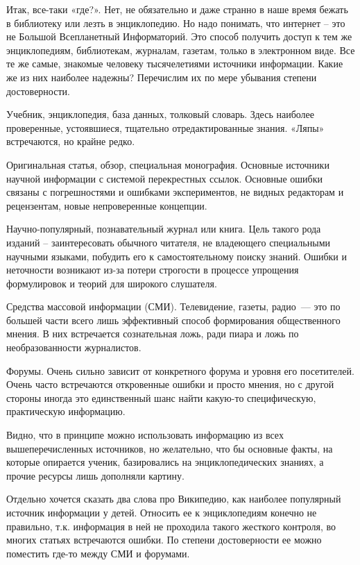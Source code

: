 Итак, все-таки «где?». Нет, не обязательно и даже странно в наше время бежать в библиотеку или лезть в энциклопедию. Но надо понимать, что интернет – это не Большой Всепланетный Информаторий. Это способ получить доступ к тем же энциклопедиям, библиотекам, журналам, газетам, только в электронном виде. Все те же самые, знакомые человеку тысячелетиями источники информации. Какие же из них наиболее надежны? Перечислим их по мере убывания степени достоверности. 

Учебник, энциклопедия, база данных, толковый словарь. Здесь наиболее проверенные, устоявшиеся, тщательно отредактированные знания. «Ляпы» встречаются, но крайне редко.

Оригинальная статья, обзор, специальная монография.  Основные источники научной информации с системой перекрестных ссылок. Основные ошибки связаны с погрешностями и ошибками экспериментов, не видных редакторам и рецензентам, новые непроверенные концепции. 

Научно-популярный, познавательный журнал или книга. Цель такого рода изданий – заинтересовать обычного читателя, не владеющего специальными научными языками, побудить его к самостоятельному поиску знаний. Ошибки и неточности возникают из-за потери строгости в процессе упрощения формулировок и теорий для широкого слушателя.

Средства массовой информации (СМИ). Телевидение, газеты, радио~--- это  по большей части всего лишь эффективный способ формирования общественного мнения. В них встречается сознательная ложь, ради пиара и ложь по необразованности журналистов. 

Форумы.  Очень сильно зависит от конкретного форума и уровня его посетителей. Очень часто встречаются откровенные ошибки и просто мнения, но с другой стороны иногда это единственный шанс найти какую-то специфическую, практическую информацию. 

Видно, что в принципе можно использовать информацию из всех вышеперечисленных источников, но желательно, что бы основные факты, на которые опирается ученик, базировались на энциклопедических знаниях, а прочие ресурсы лишь дополняли картину.

Отдельно хочется сказать два слова про Википедию, как наиболее популярный источник информации у детей. Относить ее к энциклопедиям конечно не правильно, т.к. информация в ней не проходила такого жесткого контроля, во многих статьях встречаются ошибки. По степени достоверности ее можно поместить где-то между СМИ и форумами.\\\\

